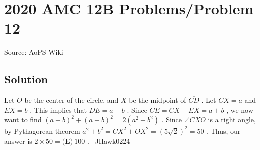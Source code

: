 \documentclass[12pt]{article}
\begin{document}
\section*{{2020 AMC 12B Problems/Problem 12}}
Source: AoPS Wiki

\subsection*{Solution}
Let $O$ be the center of the circle, and $X$ be the midpoint of $\overline{CD}$ . Let $CX=a$ and $EX=b$ . This implies that $DE = a - b$ . Since $CE = CX + EX = a + b$ , we now want to find $(a+b)^2+(a-b)^2=2(a^2+b^2)$ . Since $\angle CXO$ is a right angle, by Pythagorean theorem $a^2 + b^2 = CX^2 + OX^2 = (5\sqrt{2})^2=50$ . Thus, our answer is $2\times50=\boxed{\textbf{(E)}\ 100}$ . ~JHawk0224
\end{document}
